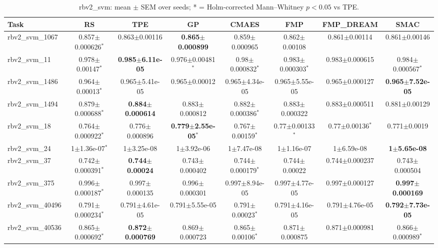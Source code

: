 \begin{table}[t]
\caption{ rbv2_svm: mean $\pm$ SEM over seeds; * = Holm-corrected Mann--Whitney $p<0.05$ vs TPE.}
\label{tab:_rbv2_svm}
\begin{center}\small
\begin{tabular}{lccccccc}
\hline
Task & RS & TPE & GP & CMAES & FMP & FMP\_DREAM & SMAC \\
\hline
rbv2\_svm\_1067 & 0.857$\pm$0.000626$^{*}$ & 0.863$\pm$0.00116 & \textbf{0.865$\pm$0.000899} & 0.859$\pm$0.000965 & 0.862$\pm$0.00108 & 0.861$\pm$0.00114 & 0.861$\pm$0.00146 \\
rbv2\_svm\_11 & 0.978$\pm$0.00147$^{*}$ & \textbf{0.985$\pm$6.11e-05} & 0.976$\pm$0.00481$^{*}$ & 0.98$\pm$0.000832$^{*}$ & 0.983$\pm$0.000303$^{*}$ & 0.983$\pm$0.000615 & 0.984$\pm$0.000567$^{*}$ \\
rbv2\_svm\_1486 & 0.964$\pm$0.00013$^{*}$ & 0.965$\pm$5.41e-05 & 0.965$\pm$0.00012 & 0.965$\pm$4.34e-05 & 0.965$\pm$5.55e-05 & 0.965$\pm$0.000127 & \textbf{0.965$\pm$7.52e-05} \\
rbv2\_svm\_1494 & 0.879$\pm$0.000688$^{*}$ & \textbf{0.884$\pm$0.000614} & 0.883$\pm$0.000812 & 0.882$\pm$0.000386$^{*}$ & 0.883$\pm$0.000322 & 0.883$\pm$0.000511 & 0.881$\pm$0.00129 \\
rbv2\_svm\_18 & 0.764$\pm$0.000922$^{*}$ & 0.776$\pm$0.000896 & \textbf{0.779$\pm$2.55e-05}$^{*}$ & 0.767$\pm$0.00159$^{*}$ & 0.77$\pm$0.00133$^{*}$ & 0.77$\pm$0.00136$^{*}$ & 0.771$\pm$0.0019 \\
rbv2\_svm\_24 & 1$\pm$1.36e-07$^{*}$ & 1$\pm$3.25e-08 & 1$\pm$3.92e-06 & 1$\pm$7.47e-08 & 1$\pm$1.16e-07 & 1$\pm$6.59e-08 & \textbf{1$\pm$5.65e-08} \\
rbv2\_svm\_37 & 0.742$\pm$0.000391$^{*}$ & \textbf{0.744$\pm$0.00024} & 0.743$\pm$0.000402 & 0.744$\pm$0.000179$^{*}$ & 0.744$\pm$0.00022 & 0.744$\pm$0.000237 & 0.743$\pm$0.000504 \\
rbv2\_svm\_375 & 0.996$\pm$0.000187$^{*}$ & 0.997$\pm$0.000135 & 0.996$\pm$0.000301 & 0.997$\pm$8.94e-05 & 0.997$\pm$4.77e-05 & 0.997$\pm$0.000127 & \textbf{0.997$\pm$0.000169} \\
rbv2\_svm\_40496 & 0.791$\pm$0.000234$^{*}$ & 0.791$\pm$4.61e-05 & 0.791$\pm$5.55e-05 & 0.791$\pm$0.00023$^{*}$ & 0.791$\pm$4.16e-05 & 0.791$\pm$4.76e-05 & \textbf{0.792$\pm$7.73e-05} \\
rbv2\_svm\_40536 & 0.865$\pm$0.000692$^{*}$ & \textbf{0.872$\pm$0.000769} & 0.869$\pm$0.000723 & 0.865$\pm$0.00106$^{*}$ & 0.871$\pm$0.000875 & 0.871$\pm$0.000981 & 0.866$\pm$0.000989$^{*}$ \\

\end{tabular}
\end{center}
\end{table}
